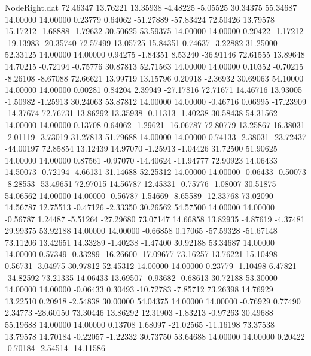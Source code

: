 \begin{filecontents}{NodeRight.dat}
  72.46347   13.76221   13.35938    -4.48225   -5.05525   30.34375   55.34687   14.00000   14.00000    0.23779    0.64062  -51.27889  -57.83424
  72.50426   13.79578   15.17212    -1.68888   -1.79632   30.50625   53.59375   14.00000   14.00000    0.20422   -1.17212  -19.13983  -20.35740
  72.57499   13.05725   15.84351     0.74637   -3.22882   31.25000   52.33125   14.00000   14.00000    0.94275   -1.84351    8.53240  -36.91146
  72.61555   13.89648   14.70215    -0.72194   -0.75776   30.87813   52.71563   14.00000   14.00000    0.10352   -0.70215   -8.26108   -8.67088
  72.66621   13.99719   13.15796     0.20918   -2.36932   30.69063   54.10000   14.00000   14.00000    0.00281    0.84204    2.39949  -27.17816
  72.71671   14.46716   13.93005    -1.50982   -1.25913   30.24063   53.87812   14.00000   14.00000   -0.46716    0.06995  -17.23909  -14.37674
  72.76731   13.86292   13.35938    -0.11313   -1.40238   30.58438   54.31562   14.00000   14.00000    0.13708    0.64062   -1.29621  -16.06787
  72.80779   13.25867   16.38031    -2.01119   -3.73019   31.27813   51.79688   14.00000   14.00000    0.74133   -2.38031  -23.72437  -44.00197
  72.85854   13.12439   14.97070    -1.25913   -1.04426   31.72500   51.90625   14.00000   14.00000    0.87561   -0.97070  -14.40624  -11.94777
  72.90923   14.06433   14.50073    -0.72194   -4.66131   31.14688   52.25312   14.00000   14.00000   -0.06433   -0.50073   -8.28553  -53.49651
  72.97015   14.56787   12.45331    -0.75776   -1.08007   30.51875   54.06562   14.00000   14.00000   -0.56787    1.54669   -8.65589  -12.33768
  73.02090   14.56787   12.75513    -0.47126   -2.33350   30.26562   54.57500   14.00000   14.00000   -0.56787    1.24487   -5.51264  -27.29680
  73.07147   14.66858   13.82935    -4.87619   -4.37481   29.99375   53.92188   14.00000   14.00000   -0.66858    0.17065  -57.59328  -51.67148
  73.11206   13.42651   14.33289    -1.40238   -1.47400   30.92188   53.34687   14.00000   14.00000    0.57349   -0.33289  -16.26600  -17.09677
  73.16257   13.76221   15.10498     0.56731   -3.04975   30.97812   52.45312   14.00000   14.00000    0.23779   -1.10498    6.47821  -34.82592
  73.21335   14.06433   13.69507    -0.93682   -0.68613   30.72188   53.30000   14.00000   14.00000   -0.06433    0.30493  -10.72783   -7.85712
  73.26398   14.76929   13.22510     0.20918   -2.54838   30.00000   54.04375   14.00000   14.00000   -0.76929    0.77490    2.34773  -28.60150
  73.30446   13.86292   12.31903    -1.83213   -0.97263   30.49688   55.19688   14.00000   14.00000    0.13708    1.68097  -21.02565  -11.16198
  73.37538   13.79578   14.70184    -0.22057   -1.22332   30.73750   53.64688   14.00000   14.00000    0.20422   -0.70184   -2.54514  -14.11586

\end{filecontents}
